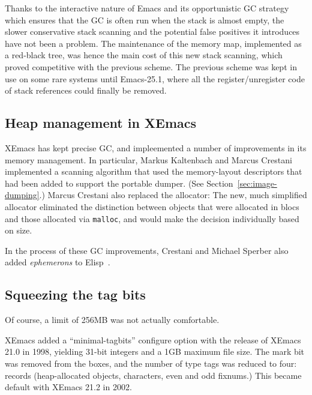 \documentclass[format=acmsmall, review=false, screen=true]{acmart}
\newcommand \Elisp {Elisp}
\begin{document}
Thanks to the interactive nature of Emacs and its opportunistic GC strategy
which ensures that the GC is often run when the stack is almost empty, the
slower conservative stack scanning and the potential false positives it
introduces have not been a problem.  The maintenance of the memory map,
implemented as a red-black tree, was hence the main cost of this new stack
scanning, which proved competitive with the previous scheme.  The previous
scheme was kept in use on some rare systems until Emacs-25.1, where all the
register/unregister code of stack references could finally be removed.

\subsection{Heap management in XEmacs}

XEmacs has kept precise GC, and impleemented a number of improvements
in its memory management.  In particular, Markus Kaltenbach and Marcus
Crestani implemented a scanning algorithm that used the memory-layout
descriptors that had been added to support the portable dumper.  (See
Section~\ref{sec:image-dumping}.)  Marcus Crestani also replaced the
allocator: The new, much simplified allocator eliminated the
distinction between objects that were allocated in blocs and those
allocated via \texttt{malloc}, and would make the decision
individually based on size.

In the process of these GC improvements, Crestani and Michael Sperber
also added \emph{ephemerons} to \Elisp{}~\cite{Hayes1997}.

\subsection{Squeezing the tag bits}

Of course, a limit of 256MB was not actually comfortable.

XEmacs added a ``minimal-tagbits'' configure option with the release
of XEmacs 21.0 in 1998, yielding 31-bit integers and a 1GB maximum
file size.
The mark bit was removed from the boxes, and the number of
type tags was reduced to four: records (heap-allocated objects,
characters, even and odd fixnums.)  This became default with XEmacs
21.2 in 2002.
\end{document}
